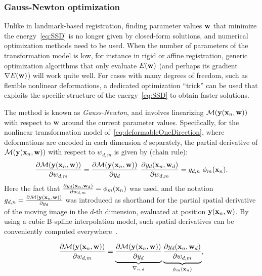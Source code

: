 \documentclass[10pt,twoside]{book}
\begin{document}
\subsubsection{Gauss-Newton optimization}
%
Unlike in landmark-based registration, finding parameter values $\mathbf{w}$ that
minimize the energy~\eqref{eq:SSD} is no longer given by closed-form solutions, and numerical optimization methods need to be used. 
% 
When the number of parameters of the transformation model is low, for instance in rigid or affine registration, generic optimization algorithms that only evaluate $E(\mathbf{w})$ (and perhaps its gradient $\nabla E(\mathbf{w})$) will work quite well.
%
For cases with many degrees of freedom, such as flexible nonlinear deformations, a dedicated optimization ``trick'' can be used that exploits the specific structure of the energy~\eqref{eq:SSD}
to obtain faster solutions.

%
The method is known as \emph{Gauss-Newton}, and involves linearizing $\mathcal{M}( \mathbf{y}( \mathbf{x}_n, \mathbf{w} ) )$ with respect to $\mathbf{w}$ around the current parameter values.
%
Specifically, for the nonlinear transformation model of~\eqref{eq:deformableOneDirection}, where deformations are encoded in each dimension $d$ separately, the partial derivative of $\mathcal{M}( \mathbf{y}( \mathbf{x}_n, \mathbf{w} ) )$ with respect to $w_{d,m}$ is given by (chain rule):
\begin{equation}
\frac{\partial \mathcal{M}( \mathbf{y}( \mathbf{x}_n, \mathbf{w} ) )}{\partial w_{d,m}}
=
\frac{\partial \mathcal{M}( \mathbf{y}( \mathbf{x}_n, \mathbf{w} ) )}{\partial y_d}
\,\,
\frac{\partial y_d( \mathbf{x}_n, \mathbf{w}_d )}{\partial w_{d,m}}
=
g_{d,n} 
\,\,
\phi_m( \mathbf{x}_n )
.
\label{eq:partialDerivative}
\end{equation}
Here the fact that $\frac{\partial y_d( \mathbf{x}_n, \mathbf{w}_d )}{\partial w_{d,m}} = \phi_m( \mathbf{x}_n )$ was used, and the notation
$g_{d,n} = \frac{\partial \mathcal{M}( \mathbf{y}( \mathbf{x}_n, \mathbf{w} ) )}{\partial y_d}$ 
was introduced as shorthand for the partial spatial derivative of the moving image 
in the $d$-th dimension,
evaluated at 
position $\mathbf{y}( \mathbf{x}_n, \mathbf{w} )$.
%
By using a cubic B-spline interpolation model, such spatial derivatives can be conveniently computed everywhere~\cite{thevenaz2000interpolation}. 
%


\iffalse
$$
\frac{\partial \mathcal{M}( \mathbf{y}( \mathbf{x}_n, \mathbf{w} ) )}{\partial w_{d,m}}
=
\underbrace{\frac{\partial \mathcal{M}( \mathbf{y}( \mathbf{x}_n, \mathbf{w} ) )}{\partial y_d}}_{\nabla_{n,d}}
\underbrace{\frac{\partial y_d( \mathbf{x}_n, \mathbf{w}_d )}{\partial w_{d,m}}}_{\phi_m( \mathbf{x}_n )}
,
$$
\end{document}
